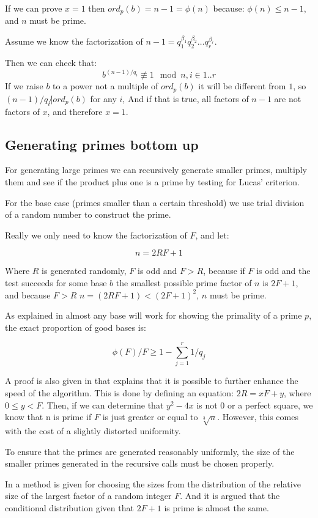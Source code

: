 \documentclass[11pt,a4paper]{article}
\begin{document}
If we can prove $x=1$ then $ord_p(b)=n-1=\phi(n)$ because: $\phi(n) \leq
n-1$, and $n$ must be prime.

Assume we know the factorization of $n-1 = q_1^{\beta_1}q_2^{\beta_2}\ldots q_r^{\beta_r}$.

Then we can check that:
\[b^{(n-1)/q_i}\not\equiv 1 \mod n, i\in{1..r}\] If we raise $b$
to a power not a multiple of $ord_p(b)$ it will be different from $1$,
so $(n-1)/q_i\not|ord_p(b)$ for any $i$, And if that is true, all
factors of $n-1$ are not factors of $x$, and therefore $x=1$.
\subsection{Generating primes bottom up}
For generating large primes we can recursively generate smaller
primes, multiply them and see if the product plus one is a prime by
testing for Lucas' criterion.

For the base case (primes smaller than a certain threshold) we use
trial division of a random number to construct the prime.

Really we only need to know the factorization of $F$, and let:

\[n = 2RF+1\] 

Where $R$ is generated randomly, $F$ is odd and $F>R$, because if $F$
is odd and the test succeeds for some base $b$ the smallest possible
prime factor of $n$ is $2F+1$, and because $F>R$ $n=(2RF+1)<(2F+1)^2$,
$n$ must be prime.

As explained in \cite{Maurer} almost any base will work for showing
the primality of a prime $p$, the exact proportion of good bases is:

\[\phi(F)/F \geq 1-\sum^r_{j=1}1/q_j\]

A proof is also given in \cite{Maurer} that explains that
it is possible to further enhance the speed of the algorithm. This is done
by defining an equation: $2R = xF + y$, where $0\le y < F$. Then, if we can 
determine that $y^2 - 4x$ is not 0 or a perfect square, we know that n 
is prime if $F$ is just greater or equal to $\sqrt[3]{n}$. However, this
comes with the cost of a slightly distorted uniformity.

To ensure that the primes are generated reasonably uniformly, the size
of the smaller primes generated in the recursive calls must be chosen
properly.

In \cite{Maurer} a method is given for choosing the sizes
from the distribution of the relative size of the largest factor of a
random integer $F$. And it is argued that the conditional distribution
given that $2F+1$ is prime is almost the same.
\end{document}
